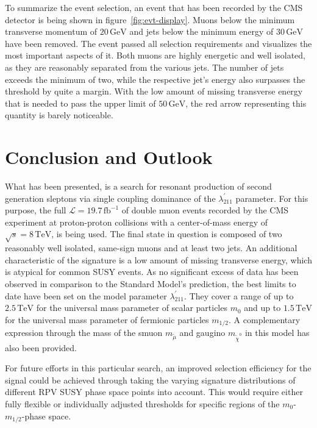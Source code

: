\noindent To summarize the event selection, an event that has been recorded by the CMS detector is being shown in figure~\ref{fig:evt-display}. Muons below the minimum transverse momentum of $20\,\text{GeV}$ and jets below the minimum energy of $30\,\text{GeV}$ have been removed. The event passed all selection requirements and visualizes the most important aspects of it. Both muons are highly energetic and well isolated, as they are reasonably separated from the various jets. The number of jets exceeds the minimum of two, while the respective jet's energy also surpasses the threshold by quite a margin. With the low amount of missing transverse energy that is needed to pass the upper limit of $50\,\text{GeV}$, the red arrow representing this quantity is barely noticeable.

\section{Conclusion and Outlook}
\label{sec:conclusion}

What has been presented, is a search for resonant production of second generation sleptons via single coupling dominance of the $\lambda^{\prime}_{211}$ parameter. For this purpose, the full $\mathcal{L} = 19.7\,\text{fb}^{-1}$ of double muon events recorded by the CMS experiment at proton-proton collisions with a center-of-mass energy of $\sqrt{s} = 8\,\text{TeV}$, is being used. The final state in question is composed of two reasonably well isolated, same-sign muons and at least two jets. An additional characteristic of the signature is a low amount of missing transverse energy, which is atypical for common SUSY events. As no significant excess of data has been observed in comparison to the Standard Model's prediction, the best limits to date have been set on the model parameter $\lambda^{\prime}_{211}$. They cover a range of up to $2.5\,\text{TeV}$ for the universal mass parameter of scalar particles $m_0$ and up to $1.5\,\text{TeV}$ for the universal mass parameter of fermionic particles $m_{1/2}$. A complementary expression through the mass of the smuon $m_{\tilde{\mu}}$ and gaugino $m_{\tilde{\chi}^0}$ in this model has also been provided.

For future efforts in this particular search, an improved selection efficiency for the signal could be achieved through taking the varying signature distributions of different RPV SUSY phase space points into account. This would require either fully flexible or individually adjusted thresholds for specific regions of the $m_0$-$m_{1/2}$-phase space.

